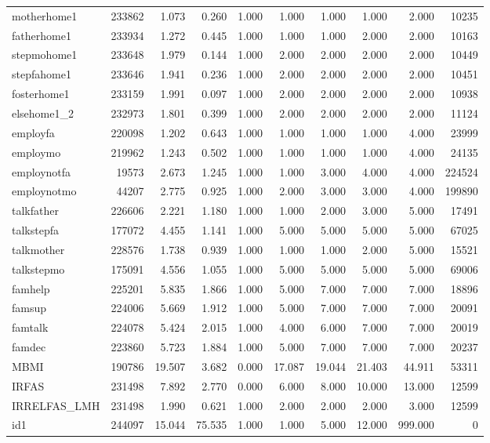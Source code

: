 \documentclass[a4paper]{article}
\begin{document}
\begin{appendices}
\begin{table}[htbp]
{\begin{tabular}{lrrrrrrrrr}
motherhome1 & 233862 & 1.073& 0.260& 1.000& 1.000& 1.000& 1.000& 2.000& 10235 \\
fatherhome1 & 233934 & 1.272& 0.445& 1.000& 1.000& 1.000& 2.000& 2.000& 10163 \\
stepmohome1 & 233648 & 1.979& 0.144& 1.000& 2.000& 2.000& 2.000& 2.000& 10449 \\
stepfahome1 & 233646 & 1.941& 0.236& 1.000& 2.000& 2.000& 2.000& 2.000& 10451 \\
fosterhome1 & 233159 & 1.991& 0.097& 1.000& 2.000& 2.000& 2.000& 2.000& 10938 \\
elsehome1\_2 & 232973 & 1.801& 0.399& 1.000& 2.000& 2.000& 2.000& 2.000& 11124 \\
employfa & 220098 & 1.202& 0.643& 1.000& 1.000& 1.000& 1.000& 4.000& 23999 \\
employmo & 219962 & 1.243& 0.502& 1.000& 1.000& 1.000& 1.000& 4.000& 24135 \\
employnotfa & 19573 & 2.673& 1.245& 1.000& 1.000& 3.000& 4.000& 4.000& 224524 \\
employnotmo & 44207 & 2.775& 0.925& 1.000& 2.000& 3.000& 3.000& 4.000& 199890 \\
talkfather & 226606 & 2.221& 1.180& 1.000& 1.000& 2.000& 3.000& 5.000& 17491 \\
talkstepfa & 177072 & 4.455& 1.141& 1.000& 5.000& 5.000& 5.000& 5.000& 67025 \\
talkmother & 228576 & 1.738& 0.939& 1.000& 1.000& 1.000& 2.000& 5.000& 15521 \\
talkstepmo & 175091 & 4.556& 1.055& 1.000& 5.000& 5.000& 5.000& 5.000& 69006 \\
famhelp & 225201 & 5.835& 1.866& 1.000& 5.000& 7.000& 7.000& 7.000& 18896 \\
famsup & 224006 & 5.669& 1.912& 1.000& 5.000& 7.000& 7.000& 7.000& 20091 \\
famtalk & 224078 & 5.424& 2.015& 1.000& 4.000& 6.000& 7.000& 7.000& 20019 \\
famdec & 223860 & 5.723& 1.884& 1.000& 5.000& 7.000& 7.000& 7.000& 20237 \\
MBMI & 190786 & 19.507& 3.682& 0.000& 17.087& 19.044& 21.403& 44.911& 53311 \\
IRFAS & 231498 & 7.892& 2.770& 0.000& 6.000& 8.000& 10.000& 13.000& 12599 \\
IRRELFAS\_LMH & 231498 & 1.990& 0.621& 1.000& 2.000& 2.000& 2.000& 3.000& 12599 \\
id1 & 244097 & 15.044& 75.535& 1.000& 1.000& 5.000& 12.000& 999.000& 0 \\

\end{tabular}}
\end{table}
\end{appendices}
\end{document}

